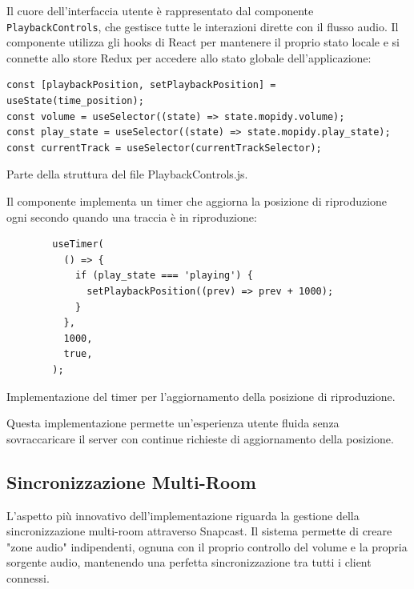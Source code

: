 Il cuore dell'interfaccia utente è rappresentato dal componente \texttt{PlaybackControls}, che gestisce tutte le interazioni dirette con il flusso audio. Il componente utilizza gli hooks di React per mantenere il proprio stato locale e si connette allo store Redux per accedere allo stato globale dell'applicazione:

\begin{table}[H]
  \begin{algorithm}[H]
    \caption{}
    \BlankLine
      \begin{verbatim}
const [playbackPosition, setPlaybackPosition] = useState(time_position);
const volume = useSelector((state) => state.mopidy.volume);
const play_state = useSelector((state) => state.mopidy.play_state);
const currentTrack = useSelector(currentTrackSelector);
      \end{verbatim}
    \end{algorithm}
    \caption{Parte della struttura del file PlaybackControls.js.}
    \label{tab:playbackcontrols_js}
  \end{table}

\newpage
Il componente implementa un timer che aggiorna la posizione di riproduzione ogni secondo quando una traccia è in riproduzione:

\begin{table}[H]
  \begin{algorithm}[H]
    \caption{}
    \BlankLine
      \begin{verbatim}
        useTimer(
          () => {
            if (play_state === 'playing') {
              setPlaybackPosition((prev) => prev + 1000);
            }
          },
          1000,
          true,
        );
      \end{verbatim}
    \end{algorithm}
    \caption{Implementazione del timer per l'aggiornamento della posizione di riproduzione.}
    \label{tab:timer_implementazione}
\end{table}

Questa implementazione permette un'esperienza utente fluida senza sovraccaricare il server con continue richieste di aggiornamento della posizione.


\subsection{Sincronizzazione Multi-Room}

L'aspetto più innovativo dell'implementazione riguarda la gestione della sincronizzazione multi-room attraverso Snapcast. Il sistema permette di creare "zone audio" indipendenti, ognuna con il proprio controllo del volume e la propria sorgente audio, mantenendo una perfetta sincronizzazione tra tutti i client connessi.

